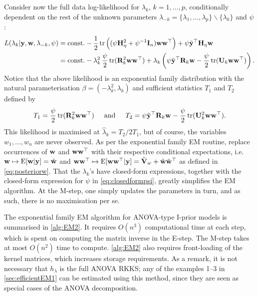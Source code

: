 Consider now the full data log-likelihood for $\lambda_k$, $k=1,\dots,p$, conditionally dependent on the rest of the unknown parameters $\lambda_{-k} = \{\lambda_1,\dots,\lambda_p\} \backslash \{ \lambda_k \}$ and $\psi$:
\begin{align}
  L(\lambda_k|\by,\bw,\lambda_{-k},\psi)
  &= \const 
  - \half \tr \Big( (
  \psi\bH_\eta^2 + \psi^{-1}\bI_n
  )\bw\bw^\top \Big)
  + \psi \tilde\by^\top \bH_\eta \bw \label{eq:logliklambdak} \\
  &= \const 
  - \lambda_k^2 \, \half[\psi] \tr(\bR_k^2 \bw\bw^\top)
  + \lambda_k  \left( 
  \psi \tilde\by^\top \bR_k \bw - \half[\psi] \tr(\bU_k \bw\bw^\top)
  \right). \nonumber
\end{align}
Notice that the above likelihood is an exponential family distribution with the natural parameterisation $\beta = (-\lambda_k^2, \lambda_k)$ and sufficient statistics $T_1$ and $T_2$ defined by
\[
  T_1 = \half[\psi] \tr(\bR_k^2 \bw\bw^\top)
  \hspace{0.5cm}\text{and}\hspace{0.5cm}
  T_2 =  \psi\tilde\by^\top \bR_k \bw - \half[\psi]\tr(\bU_k^2 \bw\bw^\top).
\]
This likelihood is maximised at $\hat\lambda_k = T_2/2T_1$, but of course, the variables $w_1,\dots,w_n$ are never observed.
As per the exponential family EM routine, replace occurrences of $\bw$ and $\bw\bw^\top$ with their respective conditional expectations, i.e. $\bw\mapsto\E[\bw|\by] = \wtilde$ and $\bw\bw^\top\mapsto\E[\bw\bw^\top|\by] = \tilde\bV_w + \wtilde\wtilde^\top$ as defined in \cref{eq:posteriorw}.
That the $\lambda_k$'s have closed-form expressions, together with the closed-form expression for $\psi$ in \cref{eq:closedformpsi}, greatly simplifies the EM algorithm.
At the M-step, one simply updates the parameters in turn, and as such, there is no maximisation per se.

The exponential family EM algorithm for ANOVA-type I-prior models is summarised in \cref{alg:EM2}.
It requires $O(n^3)$ computational time at each step, which is spent on computing the matrix inverse in the E-step.
The M-step takes at most $O(n^2)$ time to compute.
\cref{alg:EM2} also requires front-loading of the kernel matrices, which increases storage requirements. 
As a remark, it is not necessary that $h_\lambda$ is the full ANOVA RKKS; any of the examples 1--3 in \cref{sec:efficientEM1} can be estimated using this method, since they are seen as special cases of the ANOVA decomposition.

